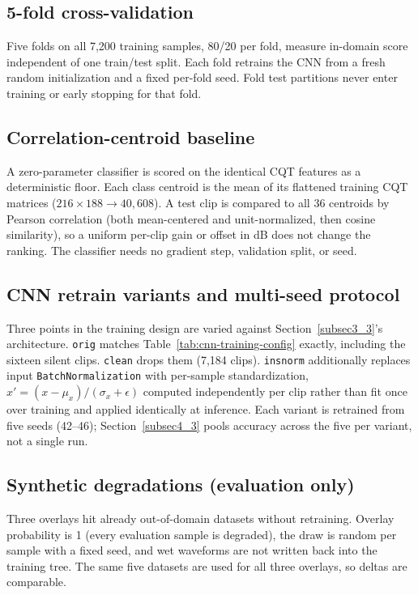 \documentclass[pdflatex,sn-mathphys-num,iicol]{sn-jnl}
\theoremstyle{thmstyleone}
\theoremstyle{thmstyletwo}
\theoremstyle{thmstylethree}
\begin{document}
\subsection{5-fold cross-validation}\label{subsec3_5}

Five folds on all 7{,}200 training samples, 80/20 per fold, measure in-domain score independent of one train/test split. Each fold retrains the CNN from a fresh random initialization and a fixed per-fold seed. Fold test partitions never enter training or early stopping for that fold.

\subsection{Correlation-centroid baseline}\label{subsec3_baseline}

A zero-parameter classifier is scored on the identical CQT features as a deterministic floor. Each class centroid is the mean of its flattened training CQT matrices ($216\times188 \to 40{,}608$). A test clip is compared to all 36 centroids by Pearson correlation (both mean-centered and unit-normalized, then cosine similarity), so a uniform per-clip gain or offset in dB does not change the ranking. The classifier needs no gradient step, validation split, or seed.

\subsection{CNN retrain variants and multi-seed protocol}\label{subsec3_variants}

Three points in the training design are varied against Section~\ref{subsec3_3}'s architecture. \texttt{orig} matches Table~\ref{tab:cnn-training-config} exactly, including the sixteen silent clips. \texttt{clean} drops them (7{,}184 clips). \texttt{insnorm} additionally replaces input \texttt{BatchNormalization} with per-sample standardization, $x' = (x-\mu_x)/(\sigma_x+\epsilon)$ computed independently per clip rather than fit once over training and applied identically at inference. Each variant is retrained from five seeds (42--46); Section~\ref{subsec4_3} pools accuracy across the five per variant, not a single run.

\subsection{Synthetic degradations (evaluation only)}\label{subsec3_7}

Three overlays hit already out-of-domain datasets without retraining. Overlay probability is 1 (every evaluation sample is degraded), the draw is random per sample with a fixed seed, and wet waveforms are not written back into the training tree. The same five datasets are used for all three overlays, so deltas are comparable.
\end{document}
